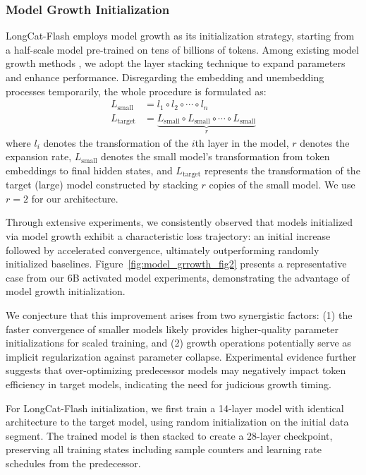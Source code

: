 \documentclass{article}
\newcommand{\longcat}{LongCat-Flash\xspace}
\begin{document}
\subsubsection{Model Growth Initialization}



\longcat employs model growth as its initialization strategy, starting from a half-scale model pre-trained on tens of billions of tokens. Among existing model growth methods \citep{chen2015net2net,du2024stacking, wang2023learning, shen2022staged, wang2023lemon, pmlr-v97-gong19a,li-etal-2020-shallow}, we adopt the layer stacking technique \citep{du2024stacking,kim2023solar,li-etal-2020-shallow} to expand parameters and enhance performance. Disregarding the embedding and unembedding processes temporarily, the whole procedure is formulated as:
\begin{align*}
    L_{\text{small}} &= l_1 \circ l_2 \circ \cdots \circ l_n \\
    L_{\text{target}} &= \underbrace{L_{\text{small}} \circ L_{\text{small}} \circ \cdots \circ L_{\text{small}}}_{r}
\end{align*}
where $l_i$ denotes the transformation of the $i$th layer in the model, $r$ denotes the expansion rate, $L_{\text{small}}$ denotes the small model's transformation from token embeddings to final hidden states, and $L_{\text{target}}$ represents the transformation of the target (large) model constructed by stacking $r$ copies of the small model. We use $r=2$ for our architecture.


Through extensive experiments, we consistently observed that models initialized via model growth exhibit a characteristic loss trajectory: an initial increase followed by accelerated convergence, ultimately outperforming randomly initialized baselines. Figure~\ref{fig:model_grrowth_fig2} presents a representative case from our 6B activated model experiments, demonstrating the advantage of model growth initialization.


We conjecture that this improvement arises from two synergistic factors: (1) the faster convergence of smaller models likely provides higher-quality parameter initializations for scaled training, and (2) growth operations potentially serve as implicit regularization against parameter collapse. Experimental evidence further suggests that over-optimizing predecessor models may negatively impact token efficiency in target models, indicating the need for judicious growth timing.

For \longcat initialization, we first train a 14-layer model with identical architecture to the target model, using random initialization on the initial data segment. The trained model is then stacked to create a 28-layer checkpoint, preserving all training states including sample counters and learning rate schedules from the predecessor.
\end{document}
